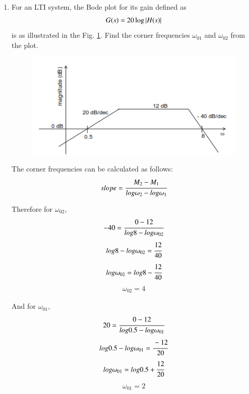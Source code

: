 \begin{enumerate}[label=\thesection.\arabic*.,ref=\thesection.\theenumi]

\item For an LTI system, the Bode plot for its gain defined as
\begin{align}
	G(s) = 20\log\abs{H(s)}
	\label{eq:ep18btech11016_gain}
\end{align}
is as illustrated in the Fig. \ref{fig:ep18btech11016_bode}. Find the corner frequencies $\omega_{01}$ and $\omega_{02}$ from the plot.
\begin{figure}[ht!]
\centering
    \includegraphics[width=\columnwidth]{./figs/ep18btech11016_fig1.png}
    \caption{}
    \label{fig:ep18btech11016_bode}
\end{figure}

\solution
The corner frequencies can be calculated as follows:
\begin{align*}
    slope = \cfrac{M_2 - M_1}{log\omega_2 - log\omega_1}\\
\end{align*}

Therefore for $\omega_{02}$,
\begin{align*}
    -40 = \cfrac{0 - 12}{log8 - log\omega_{02}}
\end{align*}
\begin{align*}
    log8 - log\omega_{02} = \cfrac{12}{40}
\end{align*}
\begin{align*}
    log\omega_{02} = log8 - \cfrac{12}{40}
\end{align*}
\begin{align*}
    \omega_{02} = 4
\end{align*}

And for $\omega_{01}$,
\begin{align*}
    20 = \cfrac{0 - 12}{log0.5 - log\omega_{01}}
\end{align*}
\begin{align}
    log0.5 - log\omega_{01} = \cfrac{-12}{20}
\end{align}{}
\begin{align*}
    log\omega_{01} = log0.5 + \cfrac{12}{20}
\end{align*}
\begin{align*}
    \omega_{01} = 2
\end{align*}


\end{enumerate}
